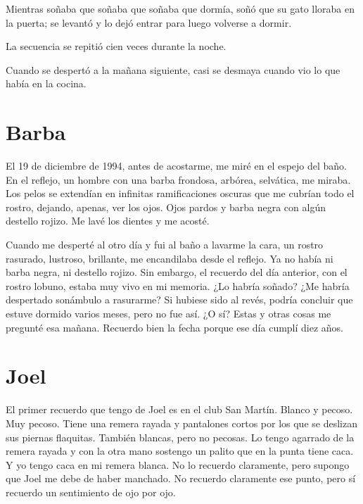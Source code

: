 \documentclass[11pt,twoside,openright]{book}
\begin{document}
Mientras soñaba que soñaba que soñaba que dormía, soñó que su gato lloraba en la puerta; se levantó y lo dejó entrar para luego volverse a dormir.

La secuencia se repitió cien veces durante la noche.

Cuando se despertó a la mañana siguiente, casi se desmaya cuando vio lo que había en la cocina.





\chapter*{Barba} 





El 19 de diciembre de 1994, antes de acostarme, me miré en el espejo del baño. En el reflejo, un hombre con una barba frondosa, arbórea, selvática, me miraba. Los pelos se extendían en infinitas ramificaciones oscuras que me cubrían todo el rostro, dejando, apenas, ver los ojos. Ojos pardos y barba negra con algún destello rojizo. Me lavé los dientes y me acosté.

Cuando me desperté al otro día y fui al baño a lavarme la cara, un rostro rasurado, lustroso, brillante, me encandilaba desde el reflejo. Ya no había ni barba negra, ni destello rojizo. Sin embargo, el recuerdo del día anterior, con el rostro lobuno, estaba muy vivo en mi memoria. ¿Lo habría soñado? ¿Me habría despertado sonámbulo a rasurarme? Si hubiese sido al revés, podría concluir que estuve dormido varios meses, pero no fue así. ¿O sí? Estas y otras cosas me pregunté esa mañana. Recuerdo bien la fecha porque ese día cumplí diez años.





\chapter*{Joel} 





El primer recuerdo que tengo de Joel es en el club San Martín. Blanco y pecoso. Muy pecoso. Tiene una remera rayada y pantalones cortos por los que se deslizan sus piernas flaquitas. También blancas, pero no pecosas. Lo tengo agarrado de la remera rayada y con la otra mano sostengo un palito que en la punta tiene caca. Y yo tengo caca en mi remera blanca. No lo recuerdo claramente, pero supongo que Joel me debe de haber manchado. No recuerdo claramente ese punto, pero sí recuerdo un sentimiento de ojo por ojo.
\end{document}
